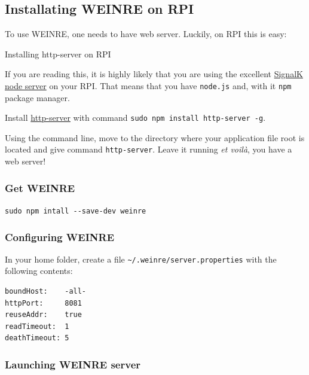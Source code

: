 \documentclass[11pt]{article}
\begin{document}
    \hypertarget{installating-weinre-on-rpi}{%
\subsection{Installating WEINRE on
RPI}\label{installating-weinre-on-rpi}}

    To use WEINRE, one needs to have web server. Luckily, on RPI this is
easy:

    Installing http-server on RPI

    If you are reading this, it is highly likely that you are using the
excellent
\href{https://github.com/SignalK/signalk-server-node/blob/master/raspberry_pi_installation.md}{SignalK
node server} on your RPI. That means that you have \texttt{node.js} and,
with it \texttt{npm} package manager.

    Install \href{https://www.npmjs.com/package/http-server}{http-server}
with command \texttt{sudo\ npm\ install\ http-server\ -g}.

    Using the command line, move to the directory where your application
file root is located and give command \texttt{http-server}. Leave it
running \emph{et voilà}, you have a web server!

    \hypertarget{get-weinre}{%
\subsubsection{Get WEINRE}\label{get-weinre}}

    \texttt{sudo\ npm\ intall\ -\/-save-dev\ weinre}

    \hypertarget{configuring-weinre}{%
\subsubsection{Configuring WEINRE}\label{configuring-weinre}}

    In your home folder, create a file
\texttt{\textasciitilde{}/.weinre/server.properties} with the following
contents:

    \begin{verbatim}
boundHost:    -all-
httpPort:     8081
reuseAddr:    true
readTimeout:  1
deathTimeout: 5
\end{verbatim}

    \hypertarget{launching-weinre-server}{%
\subsubsection{Launching WEINRE server}\label{launching-weinre-server}}
\end{document}
